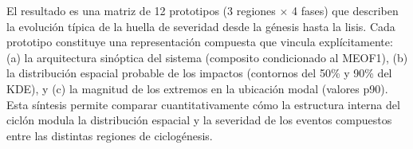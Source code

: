 El resultado es una matriz de 12 prototipos (3 regiones $\times$ 4 fases) que describen la evolución típica de la huella de severidad desde la génesis hasta la lisis. Cada prototipo constituye una representación compuesta que vincula explícitamente: (a) la arquitectura sinóptica del sistema (composito condicionado al MEOF1), (b) la distribución espacial probable de los impactos (contornos del 50\% y 90\% del KDE), y (c) la magnitud de los extremos en la ubicación modal (valores p90). Esta síntesis permite comparar cuantitativamente cómo la estructura interna del ciclón modula la distribución espacial y la severidad de los eventos compuestos entre las distintas regiones de ciclogénesis.




